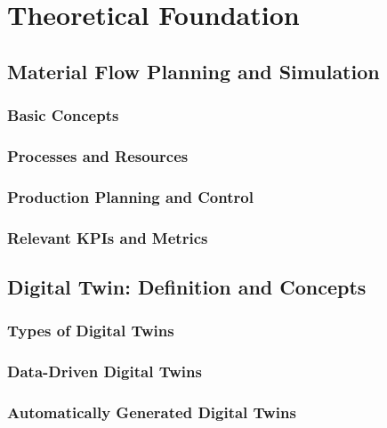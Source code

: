 \chapter{Theoretical Foundation}
\label{chap:theory}

\section{Material Flow Planning and Simulation}
\label{sec:material-flow}
\subsection{Basic Concepts}

\subsection{Processes and Resources}

\subsection{Production Planning and Control}

\subsection{Relevant KPIs and Metrics}

\section{Digital Twin: Definition and Concepts}
\label{sec:digital-twin}
\subsection{Types of Digital Twins}

\subsection{Data-Driven Digital Twins}

\subsection{Automatically Generated Digital Twins}
